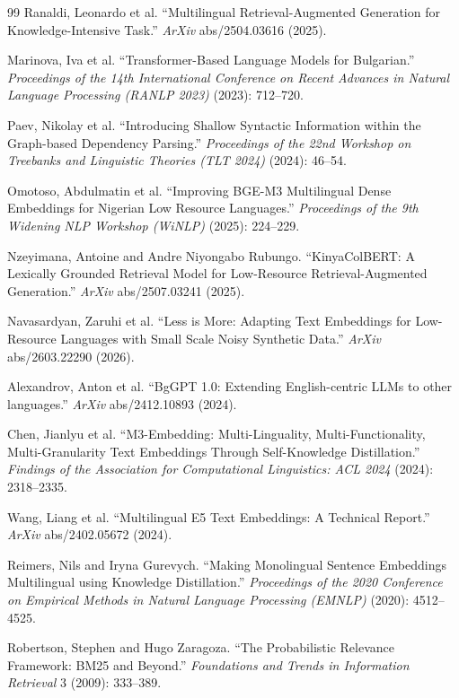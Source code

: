 \documentclass[12pt,a4paper]{article}
\begin{document}
{\begin{thebibliography}{99}
Ranaldi, Leonardo et al.
“Multilingual Retrieval-Augmented Generation for Knowledge-Intensive Task.”
\emph{ArXiv} abs/2504.03616 (2025).

Marinova, Iva et al.
“Transformer-Based Language Models for Bulgarian.”
\emph{Proceedings of the 14th International Conference on Recent Advances in Natural Language Processing (RANLP 2023)} (2023): 712--720.

Paev, Nikolay et al.
“Introducing Shallow Syntactic Information within the Graph-based Dependency Parsing.”
\emph{Proceedings of the 22nd Workshop on Treebanks and Linguistic Theories (TLT 2024)} (2024): 46--54.

Omotoso, Abdulmatin et al.
“Improving BGE-M3 Multilingual Dense Embeddings for Nigerian Low Resource Languages.”
\emph{Proceedings of the 9th Widening NLP Workshop (WiNLP)} (2025): 224--229.

Nzeyimana, Antoine and Andre Niyongabo Rubungo.
“KinyaColBERT: A Lexically Grounded Retrieval Model for Low-Resource Retrieval-Augmented Generation.”
\emph{ArXiv} abs/2507.03241 (2025).

Navasardyan, Zaruhi et al.
“Less is More: Adapting Text Embeddings for Low-Resource Languages with Small Scale Noisy Synthetic Data.”
\emph{ArXiv} abs/2603.22290 (2026).

Alexandrov, Anton et al.
“BgGPT 1.0: Extending English-centric LLMs to other languages.”
\emph{ArXiv} abs/2412.10893 (2024).

Chen, Jianlyu et al.
“M3-Embedding: Multi-Linguality, Multi-Functionality, Multi-Granularity Text Embeddings Through Self-Knowledge Distillation.”
\emph{Findings of the Association for Computational Linguistics: ACL 2024} (2024): 2318--2335.

Wang, Liang et al.
“Multilingual E5 Text Embeddings: A Technical Report.”
\emph{ArXiv} abs/2402.05672 (2024).

Reimers, Nils and Iryna Gurevych.
“Making Monolingual Sentence Embeddings Multilingual using Knowledge Distillation.”
\emph{Proceedings of the 2020 Conference on Empirical Methods in Natural Language Processing (EMNLP)} (2020): 4512--4525.

Robertson, Stephen and Hugo Zaragoza.
“The Probabilistic Relevance Framework: BM25 and Beyond.”
\emph{Foundations and Trends in Information Retrieval} 3 (2009): 333--389.


\end{thebibliography}}
\end{document}
